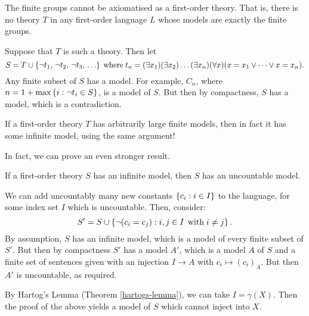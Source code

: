 \documentclass{article}
\begin{document}
\begin{proposition}
   The finite groups cannot be axiomatised as a first-order theory. That is, there is no theory $T$ in any first-order language $L$ whose models are exactly the finite groups.
\end{proposition}

\begin{prf}
    Suppose that $T$ is such a theory. Then let
    \[
	S = T \cup \set{\lnot t_1, \, \lnot t_2, \, \lnot t_3, \, \dots}
	\where t_n = (\exists x_1)(\exists x_2)\dots(\exists x_n)(\forall x)(x = x_1 \lor \dots \lor x = x_n).
	\]
	Any finite subset of $S$ has a model. For example, $C_n$, where $n = 1 + \max \left\lbrace i : \lnot t_i \in S \right\rbrace$, is a model of $S$. But then by compactness, $S$ has a model, which is a contradiction.
\end{prf}

\begin{corollary}
    If a first-order theory $T$ has arbitrarily large finite models, then in fact it has some infinite model, using the same argument!
\end{corollary}

In fact, we can prove an even stronger result.

\begin{theorem}
	\label{upward-lowenheim-skolem}
    If a first-order theory $S$ has an infinite model, then $S$ has an uncountable model.
\end{theorem}

\begin{prf}
    We can add uncountably many new constants $\left\lbrace c_i : i \in I \right\rbrace$ to the language, for some index set $I$ which is uncountable. Then, consider:
    \[
	S' = S \cup \left\lbrace \lnot (c_i = c_j) : i, j \in I \mathrel{\, \text{with}} i \neq j \right\rbrace.
	\]
	By assumption, $S$ has an infinite model, which is a model of every finite subset of $S'$. But then by compactness $S'$ has a model $A'$, which is a model $A$ of $S$ and a finite set of sentences given with an injection $I \to A$ with $c_i \mapsto (c_i)_A$. But then $A'$ is uncountable, as required.
\end{prf}

\begin{corollary}
	By Hartog's Lemma (Theorem \ref{hartogs-lemma}), we can take $I = \gamma(X)$. Then the proof of the above yields a model of $S$ which cannot inject into $X$.
\end{corollary}
\end{document}
